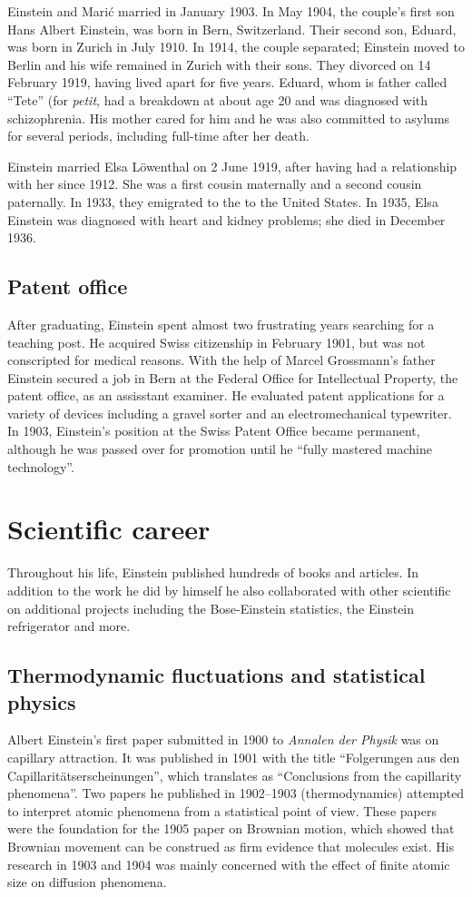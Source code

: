 \documentclass[twoside]{report}
\begin{document}
Einstein and Mari\'{c} married in January 1903. In May 1904, the couple's
first son Hans Albert Einstein, was born in Bern, Switzerland. Their
second son, Eduard, was born in Zurich in July 1910. In 1914, the couple
separated; Einstein moved to Berlin and his wife remained in Zurich
with their sons. They divorced on 14 February 1919, having lived apart
for five years. Eduard, whom is father called ``Tete'' (for \emph{petit},
had a breakdown at about age 20 and was diagnosed with schizophrenia. His
mother cared for him and he was also committed to asylums for several
periods, including full-time after her death.

Einstein married Elsa L\"{o}wenthal on 2 June 1919, after having had
a relationship with her since 1912. She was a first cousin maternally
and a second cousin paternally. In 1933, they emigrated to the to the
United States. In 1935, Elsa Einstein was diagnosed with heart and 
kidney problems; she died in December 1936.

\subsection{Patent office}

After graduating, Einstein spent almost two frustrating years searching
for a teaching post. He acquired Swiss citizenship in February 1901,
but was not conscripted for medical reasons. With the help of Marcel
Grossmann's father Einstein secured a job in Bern at the Federal Office
for Intellectual Property, the patent office, as an assisstant examiner.
He evaluated patent applications for a variety of devices including
a gravel sorter and an electromechanical typewriter. In 1903, Einstein's
position at the Swiss Patent Office became permanent, although he
was passed over for promotion until he ``fully mastered machine
technology''.

\section{Scientific career}

Throughout his life, Einstein published hundreds of books and articles.
In addition to the work he did by himself he also collaborated with
other scientific on additional projects including the Bose-Einstein
statistics, the Einstein refrigerator and more.

\subsection{Thermodynamic fluctuations and statistical physics}

Albert Einstein's first paper submitted in 1900 to 
\emph{Annalen der Physik} was on capillary attraction. It was published
in 1901 with the title ``Folgerungen aus den
Capillarit\"{a}tserscheinungen'', which translates as ``Conclusions
from the capillarity phenomena''. Two papers he published in
1902--1903 (thermodynamics) attempted to interpret atomic phenomena
from a statistical point of view. These papers were the foundation
for the 1905 paper on Brownian motion, which showed that Brownian
movement can be construed as firm evidence that molecules exist. His
research in 1903 and 1904 was mainly concerned with the effect of
finite atomic size on diffusion phenomena.
\end{document}
